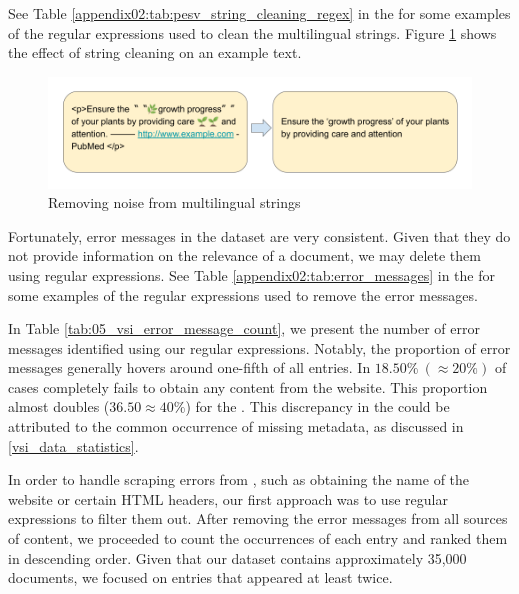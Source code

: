 See Table \ref{appendix02:tab:pesv_string_cleaning_regex} in the \appendixname{} for some examples of the regular expressions used to clean the multilingual strings. Figure \ref{fig:05_multilingual_string_cleaning} shows the effect of string cleaning on an example text.

\begin{figure}
    \centering
    \includegraphics[width=\textwidth]{Figures/05/05_multilingual_string_cleaning.png}
    \caption{Removing noise from multilingual strings}
    \label{fig:05_multilingual_string_cleaning}
\end{figure}


\label{vsi_deleting_error_messages}

Fortunately, error messages in the dataset are very consistent. Given that they do not provide information on the relevance of a document, we may delete them using regular expressions. See Table \ref{appendix02:tab:error_messages} in the \appendixname{} for some examples of the regular expressions used to remove the error messages. 



In Table \ref{tab:05_vsi_error_message_count}, we present the number of error messages identified using our regular expressions. Notably, the proportion of error messages generally hovers around one-fifth of all entries. In $18.50\%\ (\approx 20\%)$ of cases \trafilatura{} completely fails to obtain any content from the website. This proportion almost doubles ($36.50\approx 40\%$) for the \trafilaturaAbstract{}. This discrepancy in the \trafilaturaAbstract{} could be attributed to the common occurrence of missing metadata, as discussed in \headerName{} \ref{vsi_data_statistics}.


\label{05_vsi_handling_scrapping_errors}


In order to handle scraping errors from \trafilatura{}, such as obtaining the name of the website or certain HTML headers, our first approach was to use regular expressions to filter them out. After removing the error messages from all sources of content, we proceeded to count the occurrences of each entry and ranked them in descending order. Given that our dataset contains approximately 35,000 documents, we focused on entries that appeared at least twice.

